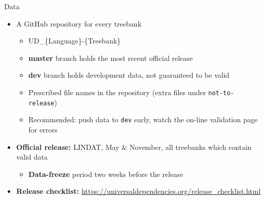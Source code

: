 \documentclass[10pt, compress, aspectratio=169]{beamer}
\begin{document}
\begin{frame}{Data}
  \begin{itemize}
    \item A GitHub repository for every treebank
      \begin{itemize}
        \item UD\_\{Language\}-\{Treebank\}
        \item \textbf{master} branch holds the most recent official
            release
        \item \textbf{dev} branch holds development data, not guaranteed
            to be valid
        \item Prescribed file names in the repository (extra files under
            \texttt{not-to-release})
        \item Recommended: push data to \texttt{dev} early, watch  the
            on-line validation page for errors
      \end{itemize}
    \item {\bf Official release:} LINDAT, May \& November, all treebanks
        which contain valid data
      \begin{itemize}
        \item \textbf{Data-freeze} period two weeks before the release
      \end{itemize}
    \item \textbf{Release checklist:}
        \url{https://universaldependencies.org/release_checklist.html}
  \end{itemize}
\end{frame}
\end{document}
